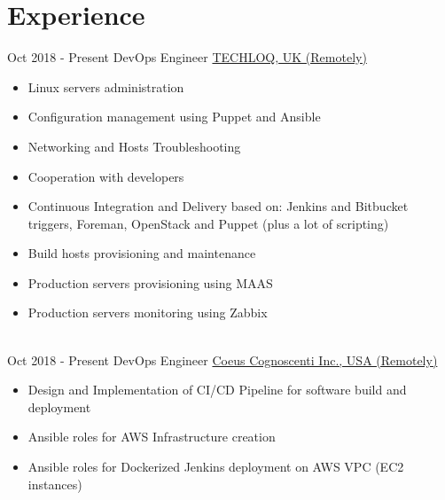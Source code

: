 \documentclass[letterpaper]{tenseconds} %
\begin{document}
\section{Experience}
\begin{twenty} %
	\twentyitem
	{Oct 2018 -}
	{Present}
	{DevOps Engineer}
	{\href{https://www.techloq.com/}{TECHLOQ, UK (Remotely)}}
	{}
	{\begin{itemize}
		\item Linux servers administration
		\item Configuration management using Puppet and Ansible
		\item Networking and Hosts Troubleshooting
		\item Cooperation with developers
		\item Continuous Integration and Delivery based on: Jenkins and Bitbucket triggers, Foreman, OpenStack and Puppet (plus a lot of scripting)
		\item Build hosts provisioning and maintenance
		\item Production servers provisioning using MAAS
		\item Production servers monitoring using Zabbix
		\end{itemize}}
	\\
	\twentyitem
	{Oct 2018 -}
	{Present}
	{DevOps Engineer}
	{\href{https://www.google.com/search?q=coueus-congnoscenti-inc}{Coeus Cognoscenti Inc., USA (Remotely)}}
	{}
	{\begin{itemize}
		\item Design and Implementation of CI/CD Pipeline for software build and deployment
		\item Ansible roles for AWS Infrastructure creation
		\item Ansible roles for Dockerized Jenkins deployment on AWS VPC (EC2 instances)
		\end{itemize}}
\end{twenty}
\end{document}
